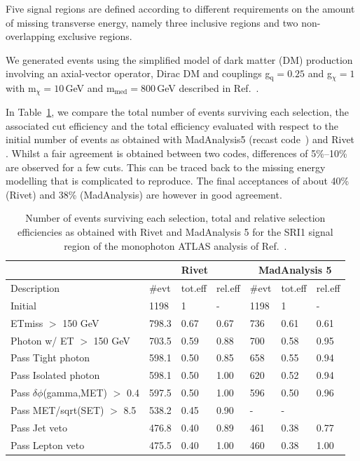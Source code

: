 \documentclass[11pt]{cernrep}
\begin{document}
Five signal regions are defined according to different requirements on the
amount of missing transverse energy, namely three inclusive regions and two
non-overlapping exclusive regions.

We generated events using the simplified model of dark matter (DM) production involving an axial-vector operator, Dirac DM and couplings g$_{\mathrm{q}}= 0.25$ and g$_{\chi} = 1$ with m$_{\chi} = 10\,$GeV and m$_{\mathrm{med}}=800\,$GeV described in Ref.~\cite{Aaboud:2017dor}.

In Table~\ref{tab:1704.03848}, we compare the total number of events surviving each selection, the associated cut
efficiency and the total efficiency evaluated with respect to the initial number
of events as obtained with MadAnalysis5 (recast code~\cite{ma5-monophoton}) 
and Rivet %
. Whilst a fair agreement is
obtained between two codes, differences of 5\%--10\% are observed for a few 
cuts. This can be traced back to the missing energy modelling that is complicated
to reproduce. 
The final acceptances of about 40\% (Rivet) and 38\% (MadAnalysis) are however 
in good agreement.  


\begin{table}
 \centering
  \begin{tabular}{ | l || l | l | l || l | l | l | }
\hline
                  &  \multicolumn{3}{c||}{\bf Rivet} & \multicolumn{3}{c||}{\bf MadAnalysis 5}    \\ \hline

Description       & \#evt & tot.eff & rel.eff & \#evt & tot.eff & rel.eff    \\ \hline \hline

Initial                    &  	1198	& 1		  & -     & 1198	& 1	 &    -      \\ \hline
ETmiss $>$ 150 GeV           &   	798.3	& 0.67	& 0.67	& 736	& 0.61 &  0.61     \\ \hline
Photon w/ ET $>$ 150 GeV     &   	703.5	& 0.59	& 0.88	& 700	& 0.58 &  0.95     \\ \hline
Pass Tight photon          &   	598.1	& 0.50	& 0.85	& 658	& 0.55 & 	0.94     \\ \hline
Pass Isolated photon       &   	598.1	& 0.50	& 1.00	& 620	& 0.52 & 	0.94     \\ \hline
Pass $\delta\phi$(gamma,MET) $>$ 0.4 &   	597.5	& 0.50	& 1.00	& 596	& 0.50 & 	0.96     \\ \hline
Pass MET/sqrt(SET) $>$ 8.5   &   	538.2	& 0.45	& 0.90	& -	  &  -   &     	     \\ \hline
Pass Jet veto              &   	476.8	& 0.40	& 0.89	& 461	& 0.38 & 	0.77     \\ \hline
Pass Lepton veto           &   	475.5	& 0.40	& 1.00	& 460	& 0.38 & 	1.00     \\ \hline
  \end{tabular}
 \caption{Number of events surviving each selection, total and relative
  selection efficiencies as obtained with Rivet and MadAnalysis 5 for the SRI1
  signal region of the monophoton ATLAS analysis of Ref.~\cite{Aaboud:2017dor}.}
 \label{tab:1704.03848}
\end{table}
\end{document}
